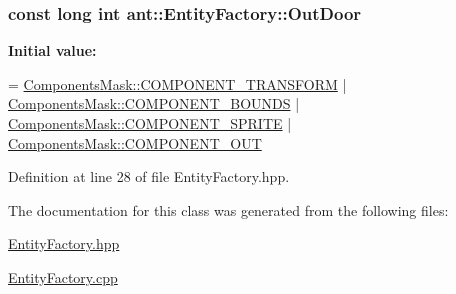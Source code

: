 \hypertarget{classant_1_1_entity_factory_a2b75fdbea2cc2348e0181380d1c9f7f1}{
\subsubsection[{Out\+Door}]{\setlength{\rightskip}{0pt plus 5cm}const long int ant\+::\+Entity\+Factory\+::\+Out\+Door\hspace{0.3cm}{\ttfamily [static]}}}\label{classant_1_1_entity_factory_a2b75fdbea2cc2348e0181380d1c9f7f1}
{\bfseries Initial value\+:}
\begin{DoxyCode}
= \hyperlink{class_components_mask_a3a66579e45c351c13abe63e61f2eaa0a}{ComponentsMask::COMPONENT\_TRANSFORM}
                                | \hyperlink{class_components_mask_a81ccaf0bf7344c970bc8474df2625ba7}{ComponentsMask::COMPONENT\_BOUNDS}
                                | \hyperlink{class_components_mask_ab05302f9381801724a58273ff83ad2a6}{ComponentsMask::COMPONENT\_SPRITE}
                                | \hyperlink{class_components_mask_ab28458934af33cdf7d3c8e128c4da866}{ComponentsMask::COMPONENT\_OUT}
\end{DoxyCode}


Definition at line 28 of file Entity\+Factory.\+hpp.



The documentation for this class was generated from the following files\+:\begin{DoxyCompactItemize}
\item 
\hyperlink{_entity_factory_8hpp}{Entity\+Factory.\+hpp}\item 
\hyperlink{_entity_factory_8cpp}{Entity\+Factory.\+cpp}\end{DoxyCompactItemize}
